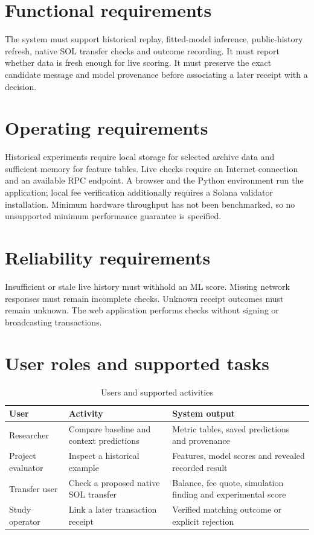 \documentclass[12pt,a4paper,oneside]{report}
\begin{document}
\section{Functional requirements}
The system must support historical replay, fitted-model inference, public-history refresh, native SOL transfer checks and outcome recording. It must report whether data is fresh enough for live scoring. It must preserve the exact candidate message and model provenance before associating a later receipt with a decision.
\section{Operating requirements}
Historical experiments require local storage for selected archive data and sufficient memory for feature tables. Live checks require an Internet connection and an available RPC endpoint. A browser and the Python environment run the application; local fee verification additionally requires a Solana validator installation. Minimum hardware throughput has not been benchmarked, so no unsupported minimum performance guarantee is specified.
\section{Reliability requirements}
Insufficient or stale live history must withhold an ML score. Missing network responses must remain incomplete checks. Unknown receipt outcomes must remain unknown. The web application performs checks without signing or broadcasting transactions.

\section{User roles and supported tasks}
\begin{table}[htbp]\centering\caption{Users and supported activities}
\begin{tabularx}{\textwidth}{p{29mm}YY}\toprule User&Activity&System output\\\midrule
Researcher&Compare baseline and context predictions&Metric tables, saved predictions and provenance\\
Project evaluator&Inspect a historical example&Features, model scores and revealed recorded result\\
Transfer user&Check a proposed native SOL transfer&Balance, fee quote, simulation finding and experimental score\\
Study operator&Link a later transaction receipt&Verified matching outcome or explicit rejection\\\bottomrule\end{tabularx}\end{table}
\end{document}
